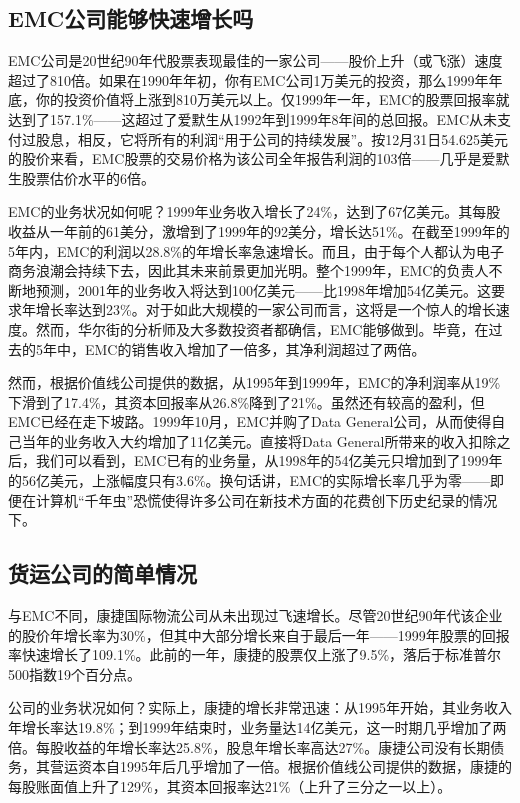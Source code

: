 \documentclass[12pt,oneside]{book}
\begin{document}
\subsection{EMC公司能够快速增长吗}
EMC公司是20世纪90年代股票表现最佳的一家公司——股价上升（或飞涨）速度超过了810倍。如果在1990年年初，你有EMC公司1万美元的投资，那么1999年年底，你的投资价值将上涨到810万美元以上。仅1999年一年，EMC的股票回报率就达到了157.1\%——这超过了爱默生从1992年到1999年8年间的总回报。EMC从未支付过股息，相反，它将所有的利润“用于公司的持续发展”。按12月31日54.625美元的股价来看，EMC股票的交易价格为该公司全年报告利润的103倍——几乎是爱默生股票估价水平的6倍。

EMC的业务状况如何呢？1999年业务收入增长了24\%，达到了67亿美元。其每股收益从一年前的61美分，激增到了1999年的92美分，增长达51\%。在截至1999年的5年内，EMC的利润以28.8\%的年增长率急速增长。而且，由于每个人都认为电子商务浪潮会持续下去，因此其未来前景更加光明。整个1999年，EMC的负责人不断地预测，2001年的业务收入将达到100亿美元——比1998年增加54亿美元。这要求年增长率达到23\%。对于如此大规模的一家公司而言，这将是一个惊人的增长速度。然而，华尔街的分析师及大多数投资者都确信，EMC能够做到。毕竟，在过去的5年中，EMC的销售收入增加了一倍多，其净利润超过了两倍。

然而，根据价值线公司提供的数据，从1995年到1999年，EMC的净利润率从19\%下滑到了17.4\%，其资本回报率从26.8\%降到了21\%。虽然还有较高的盈利，但EMC已经在走下坡路。1999年10月，EMC并购了Data General公司，从而使得自己当年的业务收入大约增加了11亿美元。直接将Data General所带来的收入扣除之后，我们可以看到，EMC已有的业务量，从1998年的54亿美元只增加到了1999年的56亿美元，上涨幅度只有3.6\%。换句话讲，EMC的实际增长率几乎为零——即便在计算机“千年虫”恐慌使得许多公司在新技术方面的花费创下历史纪录的情况下。

\subsection{货运公司的简单情况}
与EMC不同，康捷国际物流公司从未出现过飞速增长。尽管20世纪90年代该企业的股价年增长率为30\%，但其中大部分增长来自于最后一年——1999年股票的回报率快速增长了109.1\%。此前的一年，康捷的股票仅上涨了9.5\%，落后于标准普尔500指数19个百分点。

公司的业务状况如何？实际上，康捷的增长非常迅速：从1995年开始，其业务收入年增长率达19.8\%；到1999年结束时，业务量达14亿美元，这一时期几乎增加了两倍。每股收益的年增长率达25.8\%，股息年增长率高达27\%。康捷公司没有长期债务，其营运资本自1995年后几乎增加了一倍。根据价值线公司提供的数据，康捷的每股账面值上升了129\%，其资本回报率达21\%（上升了三分之一以上）。
\end{document}
